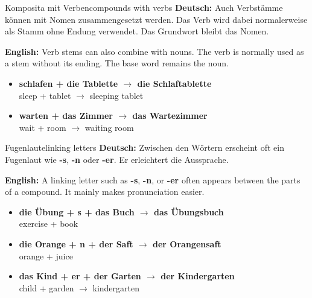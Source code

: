 \documentclass[a4paper,11pt]{article}
\newcommand{\GermanText}[1]{\textbf{Deutsch: }#1\par}
\newcommand{\EnglishText}[1]{{\small\color{SoftGray}\textbf{English: }#1\par}}
\newcommand{\ExampleItem}[2]{\item \textbf{#1}\\{\small\color{SoftGray}#2}}
\begin{document}
        \begin{grammarentry}{Komposita mit Verben}{compounds with verbs}
            \GermanText{Auch Verbstämme können mit Nomen zusammengesetzt werden. Das Verb wird dabei normalerweise als Stamm ohne Endung verwendet. Das Grundwort bleibt das Nomen.}
            \EnglishText{Verb stems can also combine with nouns. The verb is normally used as a stem without its ending. The base word remains the noun.}
            \begin{exbox}
                \begin{itemize}
                    \ExampleItem{schlafen + die Tablette $\rightarrow$ die Schlaftablette}{sleep + tablet $\rightarrow$ sleeping tablet}
                    \ExampleItem{warten + das Zimmer $\rightarrow$ das Wartezimmer}{wait + room $\rightarrow$ waiting room}
                \end{itemize}
            \end{exbox}
        \end{grammarentry}
        
        \begin{grammarentry}{Fugenlaute}{linking letters}
            \GermanText{Zwischen den Wörtern erscheint oft ein Fugenlaut wie \textbf{-s}, \textbf{-n} oder \textbf{-er}. Er erleichtert die Aussprache.}
            \EnglishText{A linking letter such as \textbf{-s}, \textbf{-n}, or \textbf{-er} often appears between the parts of a compound. It mainly makes pronunciation easier.}
            \begin{exbox}
                \begin{itemize}
                    \ExampleItem{die Übung + s + das Buch $\rightarrow$ das Übungsbuch}{exercise + book}
                    \ExampleItem{die Orange + n + der Saft $\rightarrow$ der Orangensaft}{orange + juice}
                    \ExampleItem{das Kind + er + der Garten $\rightarrow$ der Kindergarten}{child + garden $\rightarrow$ kindergarten}
                \end{itemize}
            \end{exbox}
        \end{grammarentry}
\end{document}
